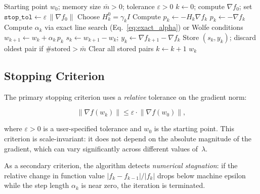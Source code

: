 \documentclass[11pt,a4paper]{article}
\newcommand{\norm}[1]{\left\|#1\right\|}
\begin{document}
\begin{algorithm}[H]
\caption{L-BFGS~\cite[Algorithm~9.2]{nocedal2006numerical}}
\label{alg:lbfgs}
\begin{algorithmic}[1]
    \Require Starting point $w_0$; memory size $\bar{m} > 0$; tolerance $\varepsilon > 0$
    \State $k \gets 0$; compute $\nabla f_0$; set $\texttt{stop\_tol} \gets \varepsilon\,\norm{\nabla f_0}$
    \While{$\norm{\nabla f_k} > \texttt{stop\_tol}$}
        \State Choose $H_k^0 = \gamma_k I$ 
        \State Compute $p_k \gets -H_k \nabla f_k$ 
         
            \State $p_k \gets -\nabla f_k$
        \EndIf
        \State Compute $\alpha_k$ via exact line search (Eq.~\eqref{eq:exact_alpha}) 
               or Wolfe conditions
        \State $w_{k+1} \gets w_k + \alpha_k\, p_k$
        \State $s_k \gets w_{k+1} - w_k$; \quad $y_k \gets \nabla f_{k+1} - \nabla f_k$
            \State Store $(s_k, y_k)$; discard oldest pair if $\#\text{stored} > \bar{m}$
            \State Clear all stored pairs 
        \EndIf
        \State $k \gets k + 1$
    \EndWhile
    \State \Return $w_k$
\end{algorithmic}
\end{algorithm}


\subsection{Stopping Criterion}
\label{sec:stopping}

The primary stopping criterion uses a \emph{relative} tolerance on the gradient norm:

\begin{equation}
\label{eq:stop_rel}
    \norm{\nabla f(w_k)} \leq \varepsilon \cdot \norm{\nabla f(w_0)},
\end{equation}

where $\varepsilon > 0$ is a user-specified tolerance and $w_0$ is the starting point. 
This criterion is scale-invariant: it does not depend on the absolute magnitude of the 
gradient, which can vary significantly across different values of~$\lambda$.

As a secondary criterion, the algorithm detects \emph{numerical stagnation}: 
if the relative change in function value $|f_{k} - f_{k-1}|/|f_k|$ drops below 
machine epsilon while the step length $\alpha_k$ is near zero, the iteration is terminated.
\end{document}
